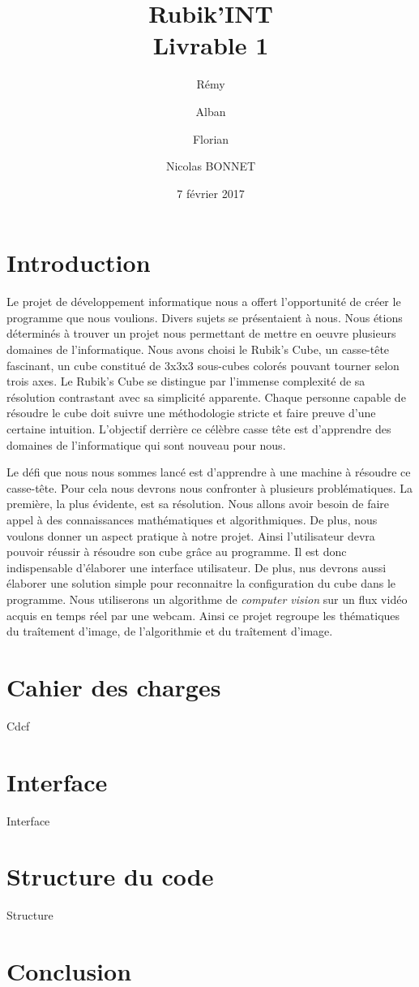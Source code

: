 \documentclass[a4paper]{report}
\title{Rubik'INT \\ Livrable 1}
\author{Rémy \bsc{ZIRNHELD} \and Alban \bsc{MANZANO} \and Florian \bsc{GRANTE} \and Nicolas {BONNET}}
\date{7 février 2017}
\begin{document}
\maketitle

\tableofcontents

\chapter*{Introduction}
Le projet de développement informatique nous a offert l'opportunité de créer le programme que nous voulions.
Divers sujets se présentaient à nous. Nous étions déterminés à trouver un projet nous permettant de mettre en oeuvre plusieurs domaines de l'informatique. 
Nous avons choisi le Rubik's Cube, un casse-tête fascinant, un cube constitué de 3x3x3 sous-cubes colorés pouvant tourner selon trois axes. 
Le Rubik's Cube se distingue par l'immense complexité de sa résolution contrastant avec sa simplicité apparente.
Chaque personne capable de résoudre le cube doit suivre une méthodologie stricte et faire preuve d'une certaine intuition.
L'objectif derrière ce célèbre casse tête est d'apprendre des domaines de l'informatique qui sont nouveau pour nous.

Le défi que nous nous sommes lancé est d'apprendre à une machine à résoudre ce casse-tête.
Pour cela nous devrons nous confronter à plusieurs problématiques.
La première, la plus évidente, est sa résolution. Nous allons avoir besoin de faire appel à des connaissances mathématiques et algorithmiques.
De plus, nous voulons donner un aspect pratique à notre projet. Ainsi l'utilisateur devra pouvoir réussir à résoudre son cube grâce au programme.
Il est donc indispensable d'élaborer une interface utilisateur.
De plus, nus devrons aussi élaborer une solution simple pour reconnaitre la configuration du cube dans le programme. Nous utiliserons un algorithme de \textit{computer vision} sur un flux vidéo acquis en temps réel par une webcam.
Ainsi ce projet regroupe les thématiques du traîtement d'image, de l'algorithmie et du traîtement d'image.


\chapter{Cahier des charges}
Cdcf

\chapter{Interface}
Interface

\chapter{Structure du code}
Structure

\chapter*{Conclusion}
\end{document}
